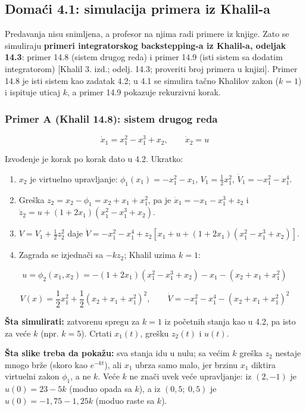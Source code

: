 \documentclass[11pt,a4paper,parskip=half,headsepline,numbers=noenddot]{scrartcl}
\begin{document}
\subsection{Domaći 4.1: simulacija primera iz Khalil-a}

Predavanja nisu snimljena, a profesor na njima radi primere iz knjige. Zato se simuliraju \textbf{primeri integratorskog backstepping-a iz Khalil-a, odeljak 14.3}: primer 14.8 (sistem drugog reda) i primer 14.9 (isti sistem sa dodatim integratorom) {[}Khalil 3. izd.; odelj. 14.3; proveriti broj primera u knjizi{]}. Primer 14.8 je isti sistem kao zadatak 4.2; u 4.1 se simulira tačno Khalilov zakon (\(k = 1\)) i ispituje uticaj \(k\), a primer 14.9 pokazuje rekurzivni korak.

\subsubsection{Primer A (Khalil 14.8): sistem drugog reda}

\[\dot x_1 = x_1^2 - x_1^3 + x_2, \qquad \dot x_2 = u\]

Izvođenje je korak po korak dato u 4.2. Ukratko:

\begin{enumerate}
\def\labelenumi{\arabic{enumi}.}
\item \(x_2\) je virtuelno upravljanje: \(\phi_1(x_1) = -x_1^2 - x_1\), \(V_1 = \frac12x_1^2\), \(\dot V_1 = -x_1^2 - x_1^4\).
\item Greška \(z_2 = x_2 - \phi_1 = x_2 + x_1 + x_1^2\), pa je \(\dot x_1 = -x_1 - x_1^3 + z_2\) i \(\dot z_2 = u + (1 + 2x_1)(x_1^2 - x_1^3 + x_2)\).
\item \(V = V_1 + \frac12z_2^2\) daje \(\dot V = -x_1^2 - x_1^4 + z_2\left[x_1 + u + (1 + 2x_1)(x_1^2 - x_1^3 + x_2)\right]\).
\item Zagrada se izjednači sa \(-kz_2\); Khalil uzima \(k = 1\):
\end{enumerate}

\[u = \phi_2(x_1, x_2) = -(1 + 2x_1)(x_1^2 - x_1^3 + x_2) - x_1 - (x_2 + x_1 + x_1^2)\]

\[V(x) = \frac12x_1^2 + \frac12(x_2 + x_1 + x_1^2)^2, \qquad \dot V = -x_1^2 - x_1^4 - (x_2 + x_1 + x_1^2)^2\]

\textbf{Šta simulirati:} zatvorenu spregu za \(k = 1\) iz početnih stanja kao u 4.2, pa isto za veće \(k\) (npr. \(k = 5\)). Crtati \(x_1(t)\), grešku \(z_2(t)\) i \(u(t)\).

\textbf{Šta slike treba da pokažu:} sva stanja idu u nulu; sa većim \(k\) greška \(z_2\) nestaje mnogo brže (skoro kao \(e^{-kt}\)), ali \(x_1\) ubrza samo malo, jer brzinu \(x_1\) diktira virtuelni zakon \(\phi_1\), a ne \(k\). Veće \(k\) ne znači uvek veće upravljanje: iz \((2, -1)\) je \(u(0) = 23 - 5k\) (moduo opada sa \(k\)), a iz \((0{,}5;\ 0{,}5)\) je \(u(0) = -1{,}75 - 1{,}25k\) (moduo raste sa \(k\)).
\end{document}
